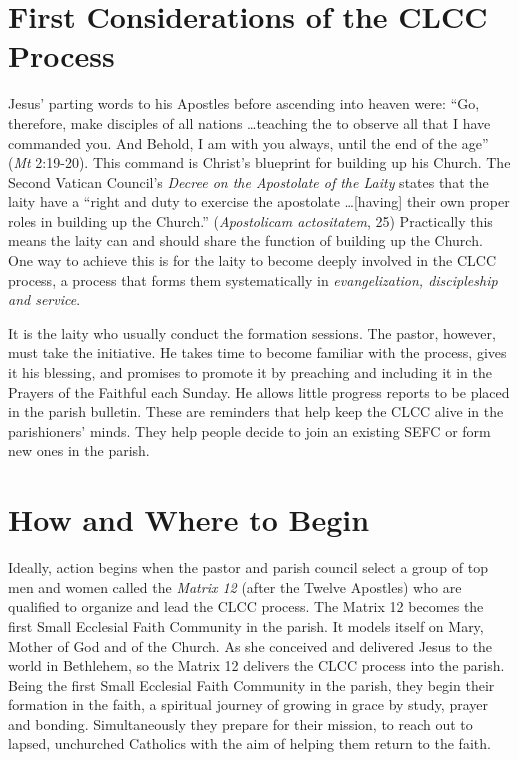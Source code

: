 \documentclass{article}
\begin{document}

\section{First Considerations of the CLCC Process}

Jesus' parting words to his Apostles before ascending into heaven were: ``Go,
therefore, make disciples of all nations \ldots teaching the to observe all that
I have commanded you. And Behold, I am with you always, until the end of the
age'' (\emph{Mt} 2:19-20). This command is Christ's blueprint for building up
his Church. The Second Vatican Council's \emph{Decree on the Apostolate of the
Laity} states that the laity have a ``right and duty to exercise the apostolate
\ldots [having] their own proper roles in building up the Church.''
(\emph{Apostolicam actositatem}, 25) Practically this means the laity can and
should share the function of building up the Church. One way to achieve this is
for the laity to become deeply involved in the CLCC process, a process that
forms them systematically in \emph{evangelization, discipleship and service}.

It is the laity who usually conduct the formation sessions. The pastor, however,
must take the initiative. He takes time to become familiar with the process,
gives it his blessing, and promises to promote it by preaching and including it
in the Prayers of the Faithful each Sunday. He allows little progress reports to
be placed in the parish bulletin. These are reminders that help keep the CLCC
alive in the parishioners' minds. They help people decide to join an existing
SEFC or form new ones in the parish.


\section{How and Where to Begin}

Ideally, action begins when the pastor and parish council select a group of top
men and women called the \emph{Matrix 12} (after the Twelve Apostles) who are
qualified to organize and lead the CLCC process. The Matrix 12 becomes the first
Small Ecclesial Faith Community in the parish. It models itself on Mary, Mother
of God and of the Church. As she conceived and delivered Jesus to the world in
Bethlehem, so the Matrix 12 delivers the CLCC process into the parish. Being the
first Small Ecclesial Faith Community in the parish, they begin their formation
in the faith, a spiritual journey of growing in grace by study, prayer and
bonding. Simultaneously they prepare for their mission, to reach out to lapsed,
unchurched Catholics with the aim of helping them return to the faith.
\end{document}
